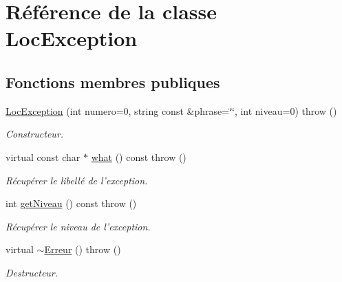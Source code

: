 \hypertarget{class_loc_exception}{
\section{Référence de la classe LocException}
\label{class_loc_exception}
}
\subsection*{Fonctions membres publiques}
\begin{DoxyCompactItemize}
\item 
\hyperlink{class_loc_exception_aab9f8d83c21dab10e85f49563d15baad}{LocException} (int numero=0, string const \&phrase=\char`\"{}\char`\"{}, int niveau=0)  throw ()
\begin{DoxyCompactList}\small\item\em Constructeur. \item\end{DoxyCompactList}\item 
virtual const char $\ast$ \hyperlink{class_loc_exception_a52ff1f609218097252ac7232a4305e28}{what} () const   throw ()
\begin{DoxyCompactList}\small\item\em Récupérer le libellé de l'exception. \item\end{DoxyCompactList}\item 
int \hyperlink{class_loc_exception_a1ba59653e71c4c564a8336a15b8a224e}{getNiveau} () const   throw ()
\begin{DoxyCompactList}\small\item\em Récupérer le niveau de l'exception. \item\end{DoxyCompactList}\item 
virtual \hyperlink{class_loc_exception_a438ab07885f36f304b84e8efaf8dda8a}{$\sim$Erreur} ()  throw ()
\begin{DoxyCompactList}\small\item\em Destructeur. \item\end{DoxyCompactList}\end{DoxyCompactItemize}


